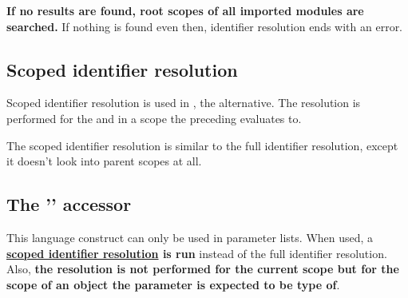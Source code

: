 \textbf{If no results are found, root scopes of all imported modules are searched.} If nothing is found even then, identifier resolution ends with an error.

\begin{comment}
\begin{code}
module a;

Void a() {}
Void b() {}

Void f() {
	// First, we search in the current scope (inside the function) -> not found
	// Then, we search in the parent scope (which is the module scope) -> found function a
	a();
	
	Int32 a;
	
	// Now when we search in the current scope, we find variable a
	a = 5;
}

$\moduleSep$
module b;

Void a() {}

class C {

@public:
	Void a() {}
	Void c() {}
	Void f() {
		
	}	
	
}

class D : @public C {
	
@public:
	Void c() {}
	Void g() {
		
	}
	
}
\end{code}
\end{comment}

\subsection{Scoped identifier resolution} \label{scopedIdentifierResolution}
Scoped identifier resolution is used in , the   alternative. The resolution is performed for the  and in a scope the preceding  evaluates to.

The scoped identifier resolution is similar to the full identifier resolution, except it doesn't look into parent scopes at all.

\subsection{The '' accessor} \label{colonAccessor}
This language construct can only be used in parameter lists. When used, a \textbf{\hyperref[scopedIdentifierResolution]{scoped identifier resolution} is run} instead of the full identifier resolution. Also, \textbf{the resolution is not performed for the current scope but for the scope of an object the parameter is expected to be type of}.

